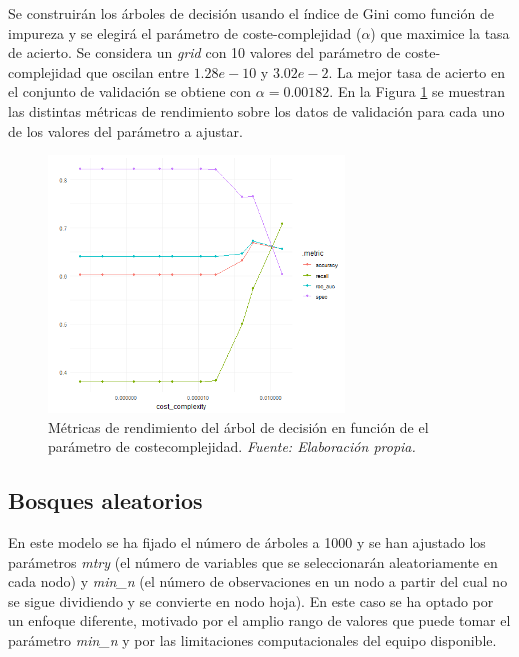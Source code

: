 \documentclass[12pt,a4paper,]{book}
\numberwithin{dummy}{section}
\theoremstyle{ocrenumbox}
\theoremstyle{blacknumex}
\theoremstyle{blacknumbox}
\theoremstyle{ocrenum}
\theoremstyle{ocrenum}
\begin{document}
Se construirán los árboles de decisión usando el índice de Gini como
función de impureza y se elegirá el parámetro de coste-complejidad
(\(\alpha\)) que maximice la tasa de acierto. Se considera un
\emph{grid} con 10 valores del parámetro de coste-complejidad que
oscilan entre \(1.28e-10\) y \(3.02e- 2\). La mejor tasa de acierto en
el conjunto de validación se obtiene con \(\alpha = 0.00182\). En la
Figura \ref{fig:dt_tuningplot} se muestran las distintas métricas de
rendimiento sobre los datos de validación para cada uno de los valores
del parámetro a ajustar.

\begin{figure}[h!]
\centering
\includegraphics[width =0.7\textwidth]{graficos/dt_tuningplot.png}
\caption{Métricas de rendimiento del árbol de decisión en función de el parámetro de coste\-complejidad. \it Fuente: Elaboración propia.}
\label{fig:dt_tuningplot}
\end{figure}

\hypertarget{bosques-aleatorios}{%
\subsection{Bosques aleatorios}\label{bosques-aleatorios}}

En este modelo se ha fijado el número de árboles a 1000 y se han
ajustado los parámetros \emph{mtry} (el número de variables que se
seleccionarán aleatoriamente en cada nodo) y \emph{min\_n} (el número de
observaciones en un nodo a partir del cual no se sigue dividiendo y se
convierte en nodo hoja). En este caso se ha optado por un enfoque
diferente, motivado por el amplio rango de valores que puede tomar el
parámetro \emph{min\_n} y por las limitaciones computacionales del
equipo disponible.
\end{document}
